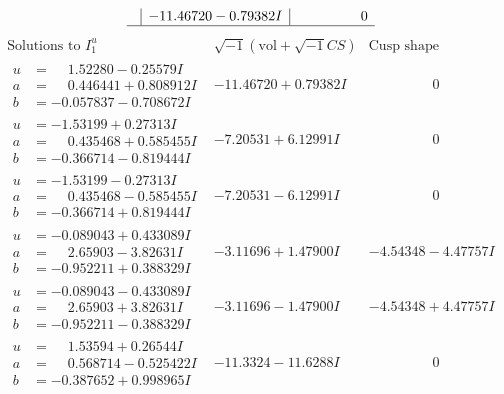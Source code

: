 \documentclass[1p]{elsarticle_modified}
\theoremstyle{definition}
\newcommand{\I}{\sqrt{-1}}
\begin{document}
$$\begin{array}{c|c|c}
 & -11.46720 - 0.79382 I & \phantom{-0.000000 } 0\\
 \hline 
 \end{array}$$\newpage$$\begin{array}{c|c|c}  
\text{Solutions to }I^u_{1}& \I (\text{vol} + \sqrt{-1}CS) & \text{Cusp shape}\\
 \hline 
\begin{aligned}
u &= \phantom{-}1.52280 - 0.25579 I \\
a &= \phantom{-}0.446441 + 0.808912 I \\
b &= -0.057837 - 0.708672 I\end{aligned}
 & -11.46720 + 0.79382 I & \phantom{-0.000000 } 0 \\ \hline\begin{aligned}
u &= -1.53199 + 0.27313 I \\
a &= \phantom{-}0.435468 + 0.585455 I \\
b &= -0.366714 - 0.819444 I\end{aligned}
 & -7.20531 + 6.12991 I & \phantom{-0.000000 } 0 \\ \hline\begin{aligned}
u &= -1.53199 - 0.27313 I \\
a &= \phantom{-}0.435468 - 0.585455 I \\
b &= -0.366714 + 0.819444 I\end{aligned}
 & -7.20531 - 6.12991 I & \phantom{-0.000000 } 0 \\ \hline\begin{aligned}
u &= -0.089043 + 0.433089 I \\
a &= \phantom{-}2.65903 - 3.82631 I \\
b &= -0.952211 + 0.388329 I\end{aligned}
 & -3.11696 + 1.47900 I & -4.54348 - 4.47757 I \\ \hline\begin{aligned}
u &= -0.089043 - 0.433089 I \\
a &= \phantom{-}2.65903 + 3.82631 I \\
b &= -0.952211 - 0.388329 I\end{aligned}
 & -3.11696 - 1.47900 I & -4.54348 + 4.47757 I \\ \hline\begin{aligned}
u &= \phantom{-}1.53594 + 0.26544 I \\
a &= \phantom{-}0.568714 - 0.525422 I \\
b &= -0.387652 + 0.998965 I\end{aligned}
 & -11.3324 - 11.6288 I & \phantom{-0.000000 } 0 \\ \hline\begin{aligned}

\end{aligned}
\end{array}$$
\end{document}
